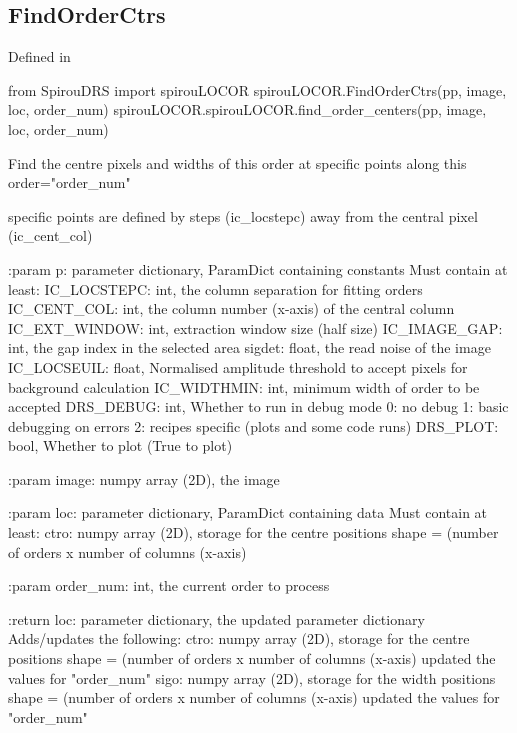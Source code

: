 \noindent\begin{minipage}{\textwidth}
\subsection{FindOrderCtrs}

Defined in \spirouLOCOR{}

\begin{pythonbox}
from SpirouDRS import spirouLOCOR
spirouLOCOR.FindOrderCtrs(pp, image, loc, order_num)
spirouLOCOR.spirouLOCOR.find_order_centers(pp, image, loc, order_num)
\end{pythonbox}

\begin{pythondocstring}
Find the centre pixels and widths of this order at specific points
along this order="order_num"

specific points are defined by steps (ic_locstepc) away from the
central pixel (ic_cent_col)

:param p: parameter dictionary, ParamDict containing constants
    Must contain at least:
            IC_LOCSTEPC: int, the column separation for fitting orders
            IC_CENT_COL: int, the column number (x-axis) of the central
                         column
            IC_EXT_WINDOW: int, extraction window size (half size)
            IC_IMAGE_GAP: int, the gap index in the selected area
            sigdet: float, the read noise of the image
            IC_LOCSEUIL: float, Normalised amplitude threshold to accept
                         pixels for background calculation
            IC_WIDTHMIN: int, minimum width of order to be accepted
            DRS_DEBUG: int, Whether to run in debug mode
                            0: no debug
                            1: basic debugging on errors
                            2: recipes specific (plots and some code runs)
            DRS_PLOT: bool, Whether to plot (True to plot)

:param image: numpy array (2D), the image

:param loc: parameter dictionary, ParamDict containing data
        Must contain at least:
            ctro: numpy array (2D), storage for the centre positions
                  shape = (number of orders x number of columns (x-axis)

:param order_num: int, the current order to process

:return loc: parameter dictionary, the updated parameter dictionary
        Adds/updates the following:
            ctro: numpy array (2D), storage for the centre positions
                  shape = (number of orders x number of columns (x-axis)
                  updated the values for "order_num"
            sigo: numpy array (2D), storage for the width positions
                  shape = (number of orders x number of columns (x-axis)
                  updated the values for "order_num"
\end{pythondocstring}
\end{minipage}

